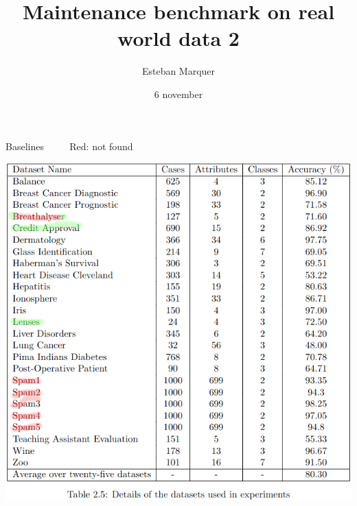 \documentclass[]{beamer}
\title{Maintenance benchmark on real world data 2}
\author{Esteban Marquer}
\date{6 november}
\begin{document}
\begin{frame}
    \titlepage
\end{frame}

    

\begin{frame}
    \tableofcontents
\end{frame}
\begin{frame}{Baselines ~~{~~{\color{red} Red: not found}}}
    \begin{center}
        \includegraphics[width=.85\textwidth]{tab2_5_.png}
    \end{center}
    
\end{frame}
    
\end{document}
